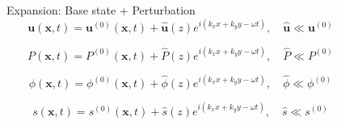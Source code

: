 \documentclass[final]{beamer} %
\newcommand\Rey{\mbox{\textit{Re}}}  %
\begin{document}
\begin{frame}[t]
\begin{columns}[t]
  \end{columns}


  \begin{columns}[t]
    \begin{column}{0.3\paperwidth}
      \begin{block}{Expansion: Base state + Perturbation}
        $$ \mathbf{u}(\mathbf{x}, t) = \mathbf{u}^{(0)}(\mathbf{x}, t) +
        \mathbf{\hat{u}}(z) e^{i(k_{x} x + k_{y} y - \omega t)},
        \quad \mathbf{\hat{u}} \ll \mathbf{u}^{(0)} $$

        $$ P(\mathbf{x}, t) = P^{(0)}(\mathbf{x}, t) +
        \hat{P}(z) e^{i(k_{x} x + k_{y} y - \omega t)},
        \quad \hat{P} \ll P^{(0)} $$

        $$ \phi(\mathbf{x}, t) = \phi^{(0)}(\mathbf{x}, t) +
        \hat{\phi}(z) e^{i(k_{x} x + k_{y} y - \omega t)},
        \quad \hat{\phi} \ll \phi^{(0)}  $$
      
        $$ s(\mathbf{x}, t) = s^{(0)}(\mathbf{x}, t) +
        \hat{s}(z) e^{i(k_{x} x + k_{y} y - \omega t)},
        \quad \hat{s} \ll s^{(0)}  $$
      \end{block}

    \end{column}

    \begin{column}{0.6\paperwidth}


    \end{column}

  \end{columns}


      
%
%
%
    

      
\end{frame}
\end{document}

